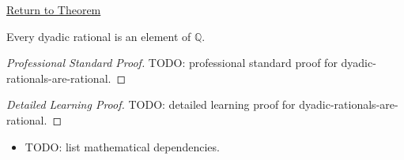 \newpage
{}
\label{prf:dyadic-rationals-are-rational}

\begin{remark*}[Return]
\hyperref[thm:dyadic-rationals-are-rational]{Return to Theorem}
\end{remark*}

\begin{theorem*}
Every dyadic rational is an element of $\mathbb{Q}$.
\end{theorem*}

\begin{proof}[Professional Standard Proof]
\LRAProofBodyStart
TODO: professional standard proof for dyadic-rationals-are-rational.
\end{proof}

\begin{proof}[Detailed Learning Proof]
\LRAProofBodyStart
TODO: detailed learning proof for dyadic-rationals-are-rational.
\end{proof}

\begin{remark*}
\end{remark*}

\begin{dependencies}
\begin{itemize}
  \item TODO: list mathematical dependencies.
\end{itemize}
\end{dependencies}

\clearpage
